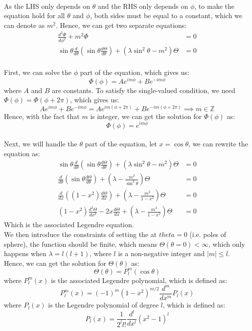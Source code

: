 \begin{foundation}
\begin{align*}
    \end{align*}
    As the LHS only depends on $\theta$ and the RHS only depends on $\phi$, to make the equation hold for all $\theta$ and $\phi$, both sides must be equal to a constant, which we can denote as $m^2$. Hence, we can get two separate equations:
    \begin{align*}
        \frac{d^2\Phi}{d\phi^2} + m^2 \Phi &= 0 \\
        \sin \theta \frac{d}{d\theta} \left( \sin \theta \frac{d\Theta}{d\theta} \right) + (\lambda \sin^2 \theta - m^2) \Theta &= 0
    \end{align*} \\

    First, we can solve the $\phi$ part of the equation, which gives us:
    \[
        \Phi(\phi) = A e^{i m \phi} + B e^{-i m \phi}
    \]
    where $A$ and $B$ are constants. To satisfy the single-valued condition, we need $\Phi(\phi) = \Phi(\phi + 2\pi)$, which gives us:
    \[
        A e^{i m \phi} + B e^{-i m \phi} = A e^{i m (\phi + 2\pi)} + B e^{-i m (\phi + 2\pi)} \implies m \in \mathbb{Z}
    \]
    Hence, with the fact that $m$ is integer, we can get the solution for $\Phi(\phi)$ as:
    \[
        \Phi(\phi) = e^{i m \phi}
    \] \\

    Next, we will handle the $\theta$ part of the equation, let $x = \cos \theta$, we can rewrite the equation as:
    \begin{align*}
        \sin \theta \frac{d}{d\theta} \left( \sin \theta \frac{d\Theta}{d\theta} \right) + (\lambda \sin^2 \theta - m^2) \Theta &= 0 \\
        \frac{d}{d\theta} \left( \sin \theta \frac{d\Theta}{d\theta} \right) + \left( \lambda - \frac{m^2}{\sin^2 \theta} \right) \Theta &= 0 \\
        \frac{d}{dx} \left( (1 - x^2) \frac{d\Theta}{dx} \right) + \left( \lambda - \frac{m^2}{1 - x^2} \right) \Theta &= 0 \\
        (1 - x^2) \frac{d^2\Theta}{dx^2} - 2x \frac{d\Theta}{dx} + \left( \lambda - \frac{m^2}{1 - x^2} \right) \Theta &= 0
    \end{align*} 
    Which is the associated Legendre equation. \\

    We then introduce the constraints of setting the at $theta = 0$ (i.e. poles of sphere), the function should be finite, which means $\Theta(\theta = 0) < \infty$, which only happens when $\lambda = l(l + 1)$, where $l$ is a non-negative integer and $|m| \leq l$. Hence, we can get the solution for $\Theta(\theta)$ as:
    \[
        \Theta(\theta) = P_l^m(\cos \theta)
    \]
    where $P_l^m(x)$ is the associated Legendre polynomial, which is defined as:
    \[
        P_l^m(x) = (-1)^m (1 - x^2)^{m/2} \frac{d^m}{dx^m} P_l(x)
    \]
    where $P_l(x)$ is the Legendre polynomial of degree $l$, which is defined as:
    \[
        P_l(x) = \frac{1}{2^l l!} \frac{d^l}{dx^l} (x^2 - 1)^l
    \] \\


\end{foundation}
